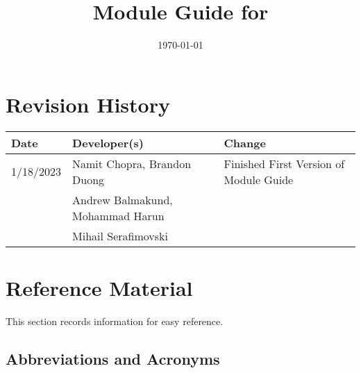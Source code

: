 \documentclass[12pt, titlepage]{article}
\begin{document}
\title{Module Guide for \progname{}} 
\author{\authname}
\date{\today}

\maketitle


\section{Revision History}

\begin{tabularx}{\textwidth}{llX}
\textbf{Date} & \textbf{Developer(s)} & \textbf{Change}\\
\midrule
1/18/2023 & Namit Chopra, Brandon Duong  & Finished First Version of Module Guide\\
 & Andrew Balmakund, Mohammad Harun \\
 & Mihail Serafimovski & \\
\bottomrule
\end{tabularx}

\newpage

\section{Reference Material}

This section records information for easy reference.

\subsection{Abbreviations and Acronyms}
\end{document}
